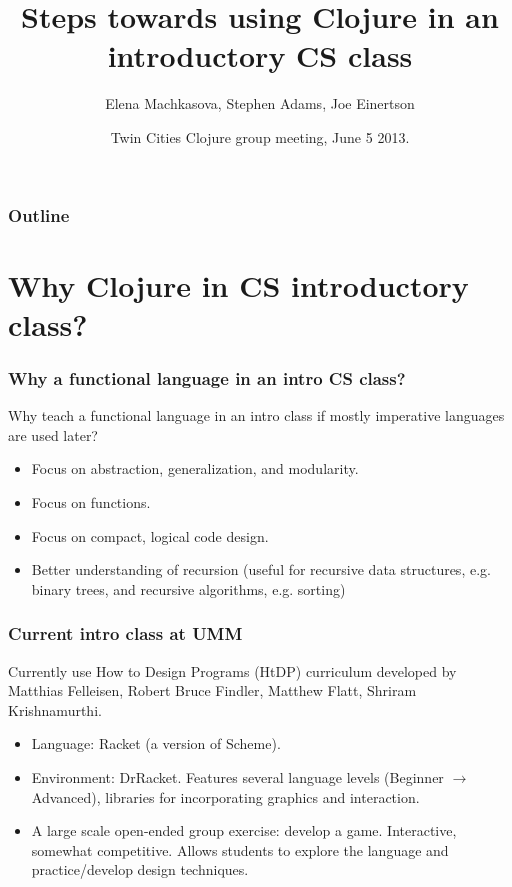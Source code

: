 \documentclass{beamer}
\newcommand{\allcomments}[1]{{#1}}
\newcommand{\elenacomment}[1]{{\bf \textcolor{ForestGreen}{\allcomments{{#1}}}}}
\begin{document}
\title{Steps towards using Clojure in an introductory CS class}
\author{Elena Machkasova, Stephen Adams, Joe Einertson}
\date[]  
{ Twin Cities Clojure group meeting, June 5 2013.}

\begin{frame}
  \titlepage
\end{frame}

\begin{frame}

  \frametitle{Outline}
\tableofcontents
\end{frame}


\section{Why Clojure in CS introductory class?}


\begin{frame}
  \frametitle{Why a functional language in an intro CS class?}
Why teach a functional language in an intro class if mostly imperative languages are used later? 
\begin{itemize}
\item Focus on abstraction, generalization, and modularity. 
\item Focus on functions.
\item Focus on compact, logical code design. 
\item Better understanding of recursion (useful for recursive data structures, e.g. binary trees, and recursive algorithms, e.g. sorting)
\end{itemize}
\end{frame}


\begin{frame}
  \frametitle{Current intro class at UMM}
Currently use How to Design Programs (HtDP) curriculum developed by Matthias Felleisen, Robert Bruce Findler, Matthew Flatt, Shriram Krishnamurthi. 
\begin{itemize}
\item Language: Racket (a version of Scheme).
\item Environment: DrRacket. Features several language levels (Beginner $\to$ Advanced), libraries for incorporating graphics and interaction. 
\item A large scale open-ended group exercise: develop a game. Interactive, somewhat competitive. Allows students to explore the language and practice/develop design techniques. 
\end{itemize}
\end{frame}
\end{document}
